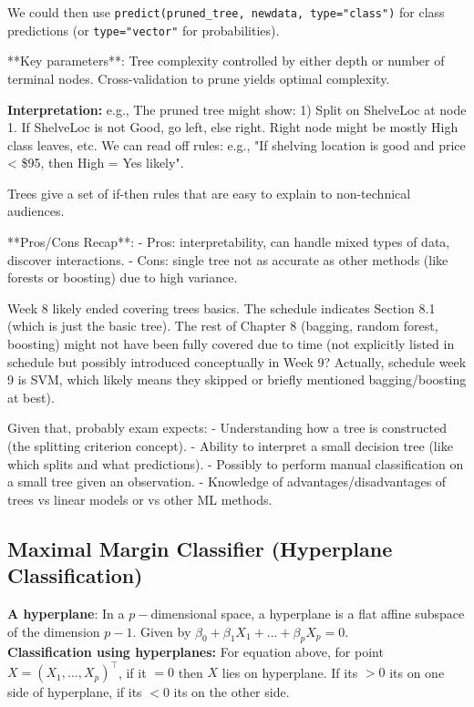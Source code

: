 \documentclass[11pt]{article}
\begin{document}
We could then use \texttt{predict(pruned\_tree, newdata, type="class")} for class predictions (or \texttt{type="vector"} for probabilities).

**Key parameters**: Tree complexity controlled by either depth or number of terminal nodes. Cross-validation to prune yields optimal complexity.

\textbf{Interpretation:} e.g., The pruned tree might show: 
1) Split on ShelveLoc at node 1. If ShelveLoc is not Good, go left, else right. Right node might be mostly High class leaves, etc. 
We can read off rules: e.g., "If shelving location is good and price < \$95, then High = Yes likely".

Trees give a set of if-then rules that are easy to explain to non-technical audiences.

**Pros/Cons Recap**:
- Pros: interpretability, can handle mixed types of data, discover interactions.
- Cons: single tree not as accurate as other methods (like forests or boosting) due to high variance.

Week 8 likely ended covering trees basics. The schedule indicates Section 8.1 (which is just the basic tree). The rest of Chapter 8 (bagging, random forest, boosting) might not have been fully covered due to time (not explicitly listed in schedule but possibly introduced conceptually in Week 9? Actually, schedule week 9 is SVM, which likely means they skipped or briefly mentioned bagging/boosting at best).

Given that, probably exam expects:
- Understanding how a tree is constructed (the splitting criterion concept).
- Ability to interpret a small decision tree (like which splits and what predictions).
- Possibly to perform manual classification on a small tree given an observation.
- Knowledge of advantages/disadvantages of trees vs linear models or vs other ML methods.

\subsection{Maximal Margin Classifier (Hyperplane Classification)}
\noindent \textbf{A hyperplane}: In a $p-$dimensional space, a hyperplane is a flat affine subspace of the dimension $p-1$. Given by $\beta_{0} + \beta_{1}X_1 +...+\beta_{p}X_p = 0$. \\

\noindent \textbf{Classification using hyperplanes:} For equation above, for point $X = (X_1,...,X_p)^{\top}$, if it $= 0$ then $X$ lies on hyperplane. If its $> 0$ its on one side of hyperplane, if its $< 0$ its on the other side. \\
\end{document}
